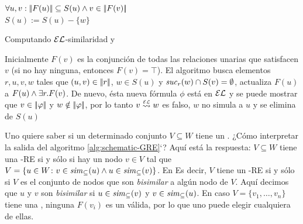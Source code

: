 \begin{algorithm}\small
{}
\io


\While{\guard}
{
  $\forall u,v: |\!|F(u)|\!| \subseteq S(u)\wedge v \in |\!|F(v)|\!|$\\
$S(u):=S(u)-\{w\}$ \label{alg:line:loop-body-begin}

} \caption{\small
Computando $\mathcal{EL}$-similaridad y \posre}\label{alg:schematic-GRE}
\end{algorithm}

Inicialmente $F(v)$ es la conjunci\'on de todas las relaciones unarias que
satisfacen $v$ (si no hay ninguna, entonces $F(v)=\top$).
El algoritmo busca elementos $r,u,v,w$ tales que
$(u,v)\in|\!|r|\!|$, $w\in S(u)$ y ${\it suc}_{r}(w)\cap
S(v)=\emptyset$, actualiza $F(u)$ a $F(u)\wedge\exists r. F(v)$.
De nuevo, \'esta nueva f\'ormula $\phi$ est\'a en $\mathcal{EL}$ y se puede mostrar que
$v\in|\!|\varphi|\!|$ y $w\notin|\!|\varphi|\!|$, por lo tanto $v\simil{\EL} w$ es falso, $w$ no simula a $u$ y se elimina de $S(u)$



%

\iffullversion Uno quiere saber si un determinado conjunto  $V\subseteq W$
tiene un \posre. ¿C\'omo interpretar la salida del algoritmo
\ref{alg:schematic-GRE}`? Aqu\'i est\'a la respuesta: $V\subseteq W$ tiene una
\EL-RE si y s\'olo si hay un nodo $v\in V$ tal que  $V=\{u\in W\colon
v\in{\it sim}_\subseteq(u) \wedge u\in{\it sim}_\subseteq(v)\}$. En
Es decir, $V$ tiene un \EL-RE si y s\'olo si $V$ es el conjunto de nodos que son
\emph{bisimilar} a alg\'un nodo de $V$. Aqu\'i decimos que $u$ y $v$
son \emph{bisimilar} si $u\in{\it sim}_\subseteq(v)$ y
$v\in{\it sim}_\subseteq(u)$. En caso  $V=\{v_1,\dots,v_n\}$ tiene una
\posre, ninguna $F(v_i)$ es un \posre v\'alida, por lo que uno puede elegir cualquiera de ellas.

